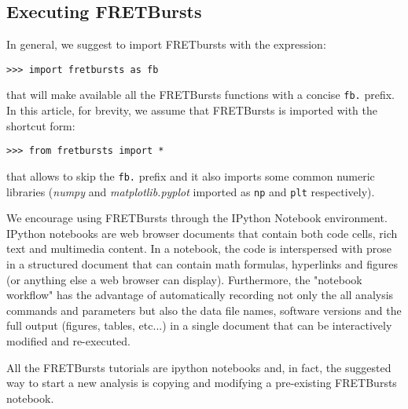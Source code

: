 \subsection{Executing FRETBursts}
In general, we suggest to import FRETbursts with the expression:

\begin{verbatim}
>>> import fretbursts as fb
\end{verbatim}

that will make available all the FRETBursts functions with a concise \verb|fb.|
prefix. In this article, for brevity, we assume that FRETBursts is imported with the
shortcut form:

\begin{verbatim}
>>> from fretbursts import *
\end{verbatim}

that allows to skip the \verb|fb.| prefix and it also imports some common numeric
libraries (\textit{numpy} and \textit{matplotlib.pyplot} imported as 
\verb|np| and \verb|plt| respectively).

We encourage using FRETBursts through the IPython Notebook environment. 
IPython notebooks are web browser documents that contain
both code cells, rich text and multimedia content. In a notebook, the code is 
interspersed with prose in a structured document that can contain math 
formulas, hyperlinks and figures (or anything else a web browser can display).
Furthermore, the "notebook workflow"\cite{Shen_2014} has the advantage 
of automatically recording not only the all analysis commands and parameters 
but also the data file names, software versions and the full output 
(figures, tables, etc...) in a single document that can be interactively 
modified and re-executed.

All the FRETBursts tutorials are 
ipython notebooks and, in fact, the suggested way to start a new analysis is 
copying and modifying a pre-existing FRETBursts notebook.
